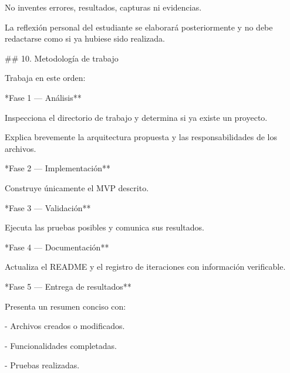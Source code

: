\par\smallskip
\noindent No inventes errores, resultados, capturas ni evidencias.\par
\par\smallskip
\noindent La reflexión personal del estudiante se elaborará posteriormente y no debe redactarse como si ya hubiese sido realizada.\par
\par\smallskip
\noindent \#\# 10. Metodología de trabajo\par
\par\smallskip
\noindent Trabaja en este orden:\par
\par\smallskip
\noindent **Fase 1 — Análisis**\par
\par\smallskip
\noindent Inspecciona el directorio de trabajo y determina si ya existe un proyecto.\par
\par\smallskip
\noindent Explica brevemente la arquitectura propuesta y las responsabilidades de los archivos.\par
\par\smallskip
\noindent **Fase 2 — Implementación**\par
\par\smallskip
\noindent Construye únicamente el MVP descrito.\par
\par\smallskip
\noindent **Fase 3 — Validación**\par
\par\smallskip
\noindent Ejecuta las pruebas posibles y comunica sus resultados.\par
\par\smallskip
\noindent **Fase 4 — Documentación**\par
\par\smallskip
\noindent Actualiza el README y el registro de iteraciones con información verificable.\par
\par\smallskip
\noindent **Fase 5 — Entrega de resultados**\par
\par\smallskip
\noindent Presenta un resumen conciso con:\par
\par\smallskip
\noindent - Archivos creados o modificados.\par
\noindent - Funcionalidades completadas.\par
\noindent - Pruebas realizadas.\par
